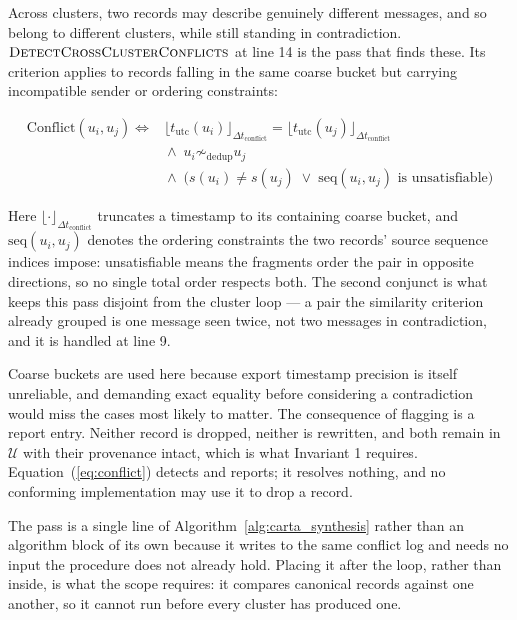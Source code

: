 Across clusters, two records may describe genuinely different messages, and so
belong to different clusters, while still standing in contradiction.
$\textsc{DetectCrossClusterConflicts}$ at line 14 is the pass that finds these.
Its criterion applies to records falling in the same coarse bucket but
carrying incompatible sender or ordering constraints:

\begin{equation}
  \begin{split}
    \mathrm{Conflict}(u_i, u_j) \iff{}
      &\lfloor t_{\text{utc}}(u_i) \rfloor_{\Delta t_{\text{conflict}}}
        = \lfloor t_{\text{utc}}(u_j) \rfloor_{\Delta t_{\text{conflict}}} \\
      &{}\land\; u_i \not\sim_{\text{dedup}} u_j \\
      &{}\land\; \big( s(u_i) \neq s(u_j)
        \;\lor\; \mathrm{seq}(u_i, u_j) \text{ is unsatisfiable} \big)
  \end{split}
  \label{eq:conflict}
\end{equation}

Here $\lfloor \cdot \rfloor_{\Delta t_{\text{conflict}}}$ truncates a timestamp
to its containing coarse bucket, and $\mathrm{seq}(u_i, u_j)$ denotes the ordering constraints
the two records' source sequence indices impose: unsatisfiable means the
fragments order the pair in opposite directions, so no single total order
respects both. The second conjunct is what keeps this pass disjoint from the
cluster loop --- a pair the similarity criterion already grouped is one message
seen twice, not two messages in contradiction, and it is handled at line 9.

Coarse buckets are used here because export timestamp precision is itself
unreliable, and demanding exact equality before considering a contradiction would
miss the cases most likely to matter. The consequence of flagging is a report
entry. Neither record is dropped, neither is rewritten, and both remain in
$\mathcal{U}$ with their provenance intact, which is what Invariant 1 requires.
Equation~(\ref{eq:conflict}) detects and reports; it resolves nothing, and no
conforming implementation may use it to drop a record.

The pass is a single line of Algorithm~\ref{alg:carta_synthesis} rather than an
algorithm block of its own because it writes to the same conflict log and needs
no input the procedure does not already hold. Placing it after the loop, rather
than inside, is what the scope requires: it compares canonical records against
one another, so it cannot run before every cluster has produced one.
